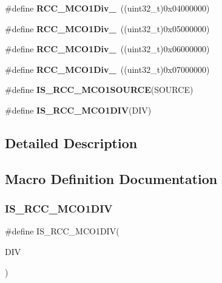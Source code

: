 \begin{DoxyCompactItemize}
\#define {\bfseries R\+C\+C\+\_\+\+M\+C\+O1\+Div\+\_}~((uint32\+\_\+t)0x04000000)
\item 
\mbox{\label{group___r_c_c___m_c_o1___clock___source___prescaler_ga298d00af4cd40822e28a5a20d6cdbfb6}} 
\#define {\bfseries R\+C\+C\+\_\+\+M\+C\+O1\+Div\+\_}~((uint32\+\_\+t)0x05000000)
\item 
\mbox{\label{group___r_c_c___m_c_o1___clock___source___prescaler_ga2300f224151c8e15424142ee4fc5f549}} 
\#define {\bfseries R\+C\+C\+\_\+\+M\+C\+O1\+Div\+\_}~((uint32\+\_\+t)0x06000000)
\item 
\mbox{\label{group___r_c_c___m_c_o1___clock___source___prescaler_ga756a1097bf0e4fe15d72f113572d0c04}} 
\#define {\bfseries R\+C\+C\+\_\+\+M\+C\+O1\+Div\+\_}~((uint32\+\_\+t)0x07000000)
\item 
\#define {\bfseries I\+S\+\_\+\+R\+C\+C\+\_\+\+M\+C\+O1\+S\+O\+U\+R\+CE}(S\+O\+U\+R\+CE)
\item 
\#define {\bfseries I\+S\+\_\+\+R\+C\+C\+\_\+\+M\+C\+O1\+D\+IV}(D\+IV)
\end{DoxyCompactItemize}


\subsection{Detailed Description}


\subsection{Macro Definition Documentation}
\mbox{\label{group___r_c_c___m_c_o1___clock___source___prescaler_ga8a8ff14a7fcdc6ef638ca8666e609c99}} 
\subsubsection{\texorpdfstring{I\+S\+\_\+\+R\+C\+C\+\_\+\+M\+C\+O1\+D\+IV}{IS\_RCC\_MCO1DIV}}
{\footnotesize\ttfamily \#define I\+S\+\_\+\+R\+C\+C\+\_\+\+M\+C\+O1\+D\+IV(\begin{DoxyParamCaption}\item[{}]{D\+IV }\end{DoxyParamCaption})}


